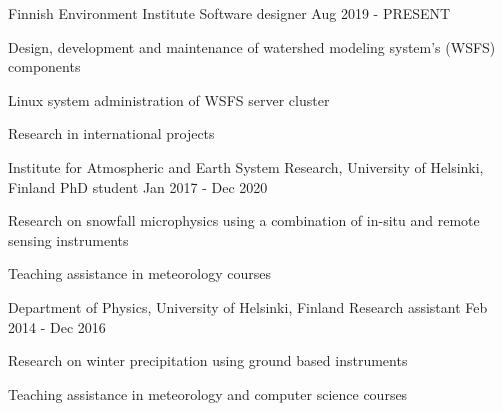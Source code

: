 

\begin{cventries}

  \cventry
    {Finnish Environment Institute} %
    {Software designer} %
    {} %
    {Aug 2019 - PRESENT} %
    {
      \begin{cvitems} %
        \item {Design, development and maintenance of watershed modeling system's (WSFS) components}
        \item {Linux system administration of WSFS server cluster}
        \item {Research in international projects}
      \end{cvitems}
    }

  \cventry
    {Institute for Atmospheric and Earth System Research, University of Helsinki, Finland} %
    {PhD student} %
    {} %
    {Jan 2017 - Dec 2020} %
    {
      \begin{cvitems} %
        \item {Research on snowfall microphysics using a combination of in-situ and remote sensing instruments}
        \item {Teaching assistance in meteorology courses}
      \end{cvitems}
    }

  \cventry
    {Department of Physics, University of Helsinki, Finland} %
    {Research assistant} %
    {} %
    {Feb 2014 - Dec 2016} %
    {
      \begin{cvitems} %
        \item {Research on winter precipitation using ground based instruments}
        \item {Teaching assistance in meteorology and computer science courses}
      \end{cvitems}
    }


\end{cventries}
